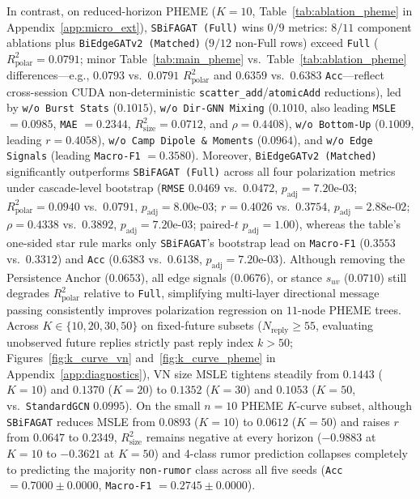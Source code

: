 \documentclass[conference]{IEEEtran}
\begin{document}
In contrast, on reduced-horizon PHEME ($K=10$, Table~\ref{tab:ablation_pheme} in Appendix~\ref{app:micro_ext}), \texttt{SBiFAGAT (Full)} wins $0/9$ metrics: $8/11$ component ablations plus \texttt{BiEdgeGATv2 (Matched)} ($9/12$ non-Full rows) exceed \texttt{Full} ($R^2_{\text{polar}} = 0.0791$; minor Table~\ref{tab:main_pheme} vs.\ Table~\ref{tab:ablation_pheme} differences---e.g., $0.0793$ vs.\ $0.0791$ $R^2_{\text{polar}}$ and $0.6359$ vs.\ $0.6383$ \texttt{Acc}---reflect cross-session CUDA non-deterministic \texttt{scatter\_add}/\texttt{atomicAdd} reductions), led by \texttt{w/o Burst Stats} ($0.1015$), \texttt{w/o Dir-GNN Mixing} ($0.1010$, also leading \texttt{MSLE} $= 0.0985$, \texttt{MAE} $= 0.2344$, $R^2_{\text{size}} = 0.0712$, and $\rho = 0.4408$), \texttt{w/o Bottom-Up} ($0.1009$, leading $r = 0.4058$), \texttt{w/o Camp Dipole \& Moments} ($0.0964$), and \texttt{w/o Edge Signals} (leading \texttt{Macro-F1} $= 0.3580$). Moreover, \texttt{BiEdgeGATv2 (Matched)} significantly outperforms \texttt{SBiFAGAT (Full)} across all four polarization metrics under cascade-level bootstrap (\texttt{RMSE} $0.0469$ vs.\ $0.0472$, $p_{\text{adj}} = 7.20\text{e-}03$; $R^2_{\text{polar}} = 0.0940$ vs.\ $0.0791$, $p_{\text{adj}} = 8.00\text{e-}03$; $r = 0.4026$ vs.\ $0.3754$, $p_{\text{adj}} = 2.88\text{e-}02$; $\rho = 0.4338$ vs.\ $0.3892$, $p_{\text{adj}} = 7.20\text{e-}03$; paired-$t$ $p_{\text{adj}} = 1.00$), whereas the table's one-sided star rule marks only \texttt{SBiFAGAT}'s bootstrap lead on \texttt{Macro-F1} ($0.3553$ vs.\ $0.3312$) and \texttt{Acc} ($0.6383$ vs.\ $0.6138$, $p_{\text{adj}} = 7.20\text{e-}03$). Although removing the Persistence Anchor ($0.0653$), all edge signals ($0.0676$), or stance $s_{uv}$ ($0.0710$) still degrades $R^2_{\text{polar}}$ relative to \texttt{Full}, simplifying multi-layer directional message passing consistently improves polarization regression on $11$-node PHEME trees. Across $K \in \{10, 20, 30, 50\}$ on fixed-future subsets ($N_{\text{reply}} \ge 55$, evaluating unobserved future replies strictly past reply index $k > 50$; Figures~\ref{fig:k_curve_vn} and~\ref{fig:k_curve_pheme} in Appendix~\ref{app:diagnostics}), VN size MSLE tightens steadily from $0.1443$ ($K=10$) and $0.1370$ ($K=20$) to $0.1352$ ($K=30$) and $0.1053$ ($K=50$, vs.\ \texttt{StandardGCN} $0.0995$). On the small $n=10$ PHEME $K$-curve subset, although \texttt{SBiFAGAT} reduces MSLE from $0.0893$ ($K=10$) to $0.0612$ ($K=50$) and raises $r$ from $0.0647$ to $0.2349$, $R^2_{\text{size}}$ remains negative at every horizon ($-0.9883$ at $K=10$ to $-0.3621$ at $K=50$) and 4-class rumor prediction collapses completely to predicting the majority \texttt{non-rumor} class across all five seeds (\texttt{Acc} $= 0.7000 \pm 0.0000$, \texttt{Macro-F1} $= 0.2745 \pm 0.0000$).
\end{document}
